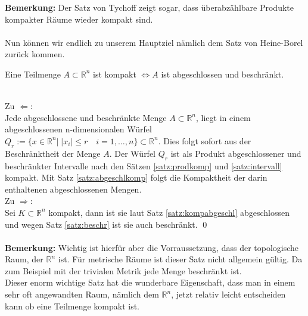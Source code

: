 \textbf{Bemerkung:} Der Satz von Tychoff zeigt sogar, dass überabzählbare Produkte kompakter Räume wieder kompakt sind. \\
%
\\
Nun können wir endlich zu unserem Hauptziel nämlich dem Satz von Heine-Borel zurück kommen.
%	
\begin{Satz}
	Eine Teilmenge  \( A \subset \mathbb{R}^n \) ist kompakt \(\Leftrightarrow A \) ist abgeschlossen und beschränkt.
\end{Satz}
%
 \\
	Zu \(\Leftarrow \): \\
	Jede abgeschlossene und beschränkte Menge \(A \subset\mathbb{R}^n \), liegt in einem abgeschlossenen n-dimensionalen Würfel
	\( Q_r:= \{ x \in \mathbb{R}^n | \; |x_i| \leq r \quad i=1, \dots, n\} \subset \mathbb{R}^n \). 
	Dies folgt sofort aus der Beschränktheit der Menge \(A\). Der Würfel \(Q_r\) ist als Produkt abgeschlossener und beschränkter Intervalle nach den Sätzen \ref{satz:prodkomp} und \ref{satz:intervall} kompakt.
	Mit Satz \ref{satz:abgeschlkomp} folgt die Kompaktheit der darin enthaltenen abgeschlossenen Mengen.
	\\
	Zu \(\Rightarrow \): \\
	Sei \( K \subset \mathbb{R}^n \) kompakt, dann ist sie laut Satz \ref{satz:kompabgeschl} abgeschlossen und wegen Satz \ref{satz:beschr} ist sie auch beschränkt.
\qed \\
%
\\
\textbf{Bemerkung:} Wichtig ist hierfür aber die Vorraussetzung, dass der topologische Raum, der \(\mathbb{R}^n \) ist. Für metrische Räume ist dieser Satz nicht allgemein gültig. 
Da zum Beispiel mit der trivialen Metrik jede Menge beschränkt ist.
\\
%
Dieser enorm wichtige Satz hat die wunderbare Eigenschaft, dass man in einem sehr oft angewandten Raum, nämlich dem \(\mathbb{R}^n \), 
jetzt relativ leicht entscheiden kann ob eine Teilmenge kompakt ist. 


